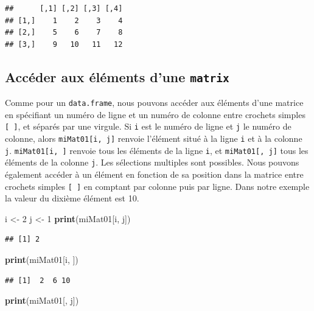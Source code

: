 \documentclass[twoside,symmetric]{book}
\newenvironment{Shaded}{}{}
\newcommand{\DecValTok}[1]{#1}
\newcommand{\KeywordTok}[1]{\textbf{#1}}
\newcommand{\NormalTok}[1]{#1}
\newcommand{\StringTok}[1]{#1}
\begin{document}
\begin{verbatim}
##      [,1] [,2] [,3] [,4]
## [1,]    1    2    3    4
## [2,]    5    6    7    8
## [3,]    9   10   11   12
\end{verbatim}

\hypertarget{accuxe9der-aux-uxe9luxe9ments-dune-matrix}{%
\subsection{\texorpdfstring{Accéder aux éléments d'une \texttt{matrix}}{Accéder aux éléments d'une matrix}}\label{accuxe9der-aux-uxe9luxe9ments-dune-matrix}}

Comme pour un \texttt{data.frame}, nous pouvons accéder aux éléments d'une matrice en spécifiant un numéro de ligne et un numéro de colonne entre crochets simples \texttt{{[}\ {]}}, et séparés par une virgule. Si \texttt{i} est le numéro de ligne et \texttt{j} le numéro de colonne, alors \texttt{miMat01{[}i,\ j{]}} renvoie l'élément situé à la ligne \texttt{i} et à la colonne \texttt{j}. \texttt{miMat01{[}i,\ {]}} renvoie tous les éléments de la ligne \texttt{i}, et \texttt{miMat01{[},\ j{]}} tous les éléments de la colonne \texttt{j}. Les sélections multiples sont possibles. Nous pouvons également accéder à un élément en fonction de sa position dans la matrice entre crochets simples \texttt{{[}\ {]}} en comptant par colonne puis par ligne. Dans notre exemple la valeur du dixième élément est 10.

\begin{Shaded}
\begin{Highlighting}[]
\NormalTok{i <-}\StringTok{ }\DecValTok{2}
\NormalTok{j <-}\StringTok{ }\DecValTok{1}
\KeywordTok{print}\NormalTok{(miMat01[i, j])}
\end{Highlighting}
\end{Shaded}

\begin{verbatim}
## [1] 2
\end{verbatim}

\begin{Shaded}
\begin{Highlighting}[]
\KeywordTok{print}\NormalTok{(miMat01[i, ])}
\end{Highlighting}
\end{Shaded}

\begin{verbatim}
## [1]  2  6 10
\end{verbatim}

\begin{Shaded}
\begin{Highlighting}[]
\KeywordTok{print}\NormalTok{(miMat01[, j])}
\end{Highlighting}
\end{Shaded}
\end{document}
